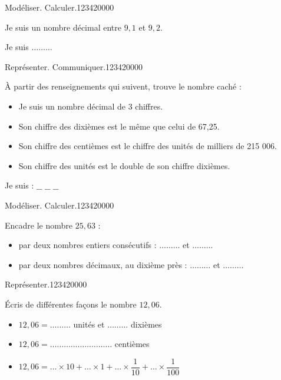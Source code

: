 \begin{pageParcoursu} 

 
\begin{ExoCu}{Modéliser. Calculer.}{1234}{2}{0}{0}{0}{0}

Je suis un nombre décimal entre  $9,1$ et $9,2$.\vspace{0.3cm}

Je suis $\ldots \ldots\ldots$
\end{ExoCu}

\begin{ExoCu}{Représenter. Communiquer.}{1234}{2}{0}{0}{0}{0}

 
À partir des renseignements qui suivent, trouve le nombre caché :

\begin{itemize}
\item  Je suis un nombre décimal de 3 chiffres.
\item  Son chiffre des dixièmes est le même que celui de 67,25.
\item  Son chiffre des centièmes est le chiffre des unités de milliers de 215 006.
\item  Son chiffre des unités est le double de son chiffre dixièmes.
\end{itemize}
 
Je suis : $\_\_$ $\_\_$ $\_\_$ 

\end{ExoCu}

\begin{ExoCu}{Modéliser. Calculer.}{1234}{2}{0}{0}{0}{0}

Encadre le nombre $25,63$ :

\begin{itemize}
\item par deux nombres entiers consécutifs : $\ldots\ldots\ldots$ et $\ldots\ldots\ldots$ \vspace{0.3cm}
\item par deux nombres décimaux, au dixième près : $\ldots\ldots\ldots$ et $\ldots\ldots\ldots$ \vspace{0.3cm}
\end{itemize} 
 
\end{ExoCu}

\begin{ExoCu}{Représenter.}{1234}{2}{0}{0}{0}{0}


Écris de différentes façons le nombre $12,06$.

\begin{itemize}
\item $12,06 = \ldots\ldots\ldots$ unités et $\ldots\ldots\ldots$ dixièmes \vspace{0.3cm}
\item $12,06 =\ldots\ldots\ldots  \ldots\ldots\ldots \ldots\ldots\ldots$ centièmes\vspace{0.2cm}
\item $12,06 =\ldots\times 10 + \ldots\times 1 + \ldots\times \dfrac{1}{10} +  \ldots\times \dfrac{1}{100}$ 
\end{itemize}


\end{ExoCu}
\end{pageParcoursu}
